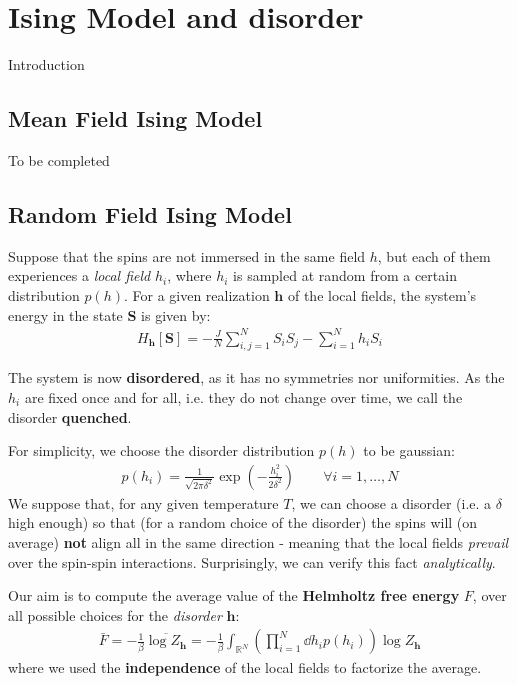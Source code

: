 \documentclass[../template.tex]{subfiles}
\begin{document}
\chapter{Ising Model and disorder}

Introduction

\section{Mean Field Ising Model}
To be completed

\section{Random Field Ising Model}
Suppose that the spins are not immersed in the same field $h$, but each of them experiences a \textit{local field} $h_i$, where $h_i$ is sampled at random from a certain distribution $p(h)$. For a given realization $\bm{h}$ of the local fields, the system's energy in the state $\bm{S}$ is given by:
\begin{align}\label{eqn:disordered-energy}
    H_{\bm{h}}[\bm{S}] = -\frac{J}{N} \sum_{i,j=1}^N S_i S_j - \sum_{i=1}^N h_i S_i
\end{align}

The system is now \textbf{disordered}, as it has no symmetries nor uniformities. As the $h_i$ are fixed once and for all, i.e. they do not change over time, we call the disorder \textbf{quenched}.  

\medskip

For simplicity, we choose the disorder distribution $p(h)$ to be gaussian:
\begin{align} \label{eqn:disorder-dist}
    p(h_i) = \frac{1}{\sqrt{2 \pi \delta^2}} \exp\left(-\frac{h_i^2}{2 \delta^2} \right) \qquad \forall i=1,\dots,N
\end{align}
We suppose that, for any given temperature $T$, we can choose a disorder  (i.e. a $\delta$ high enough) so that (for a random choice of the disorder) the spins will (on average) \textbf{not} align all in the same direction - meaning that the local fields \textit{prevail} over the spin-spin interactions. Surprisingly, we can verify this fact \textit{analytically}.   

\medskip

Our aim is to compute the average value of the \textbf{Helmholtz free energy} $F$, over all possible choices for the \textit{disorder} $\bm{h}$:
\begin{align}\label{eqn:mean-free-energy}
    \bar{F} = -\frac{1}{\beta}  \overline{\log Z_{\bm{h}}} =  - \frac{1}{\beta}  \int_{\mathbb{R}^N} \left(\prod_{i=1}^N \dd{h_i} p(h_i)\right) \log Z_{\bm{h}} 
\end{align} 
where we used the \textbf{independence} of the local fields to factorize the average. 
\end{document}
